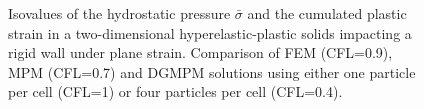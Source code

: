 \begin{figure}[h!]
  \centering
  \caption{Isovalues of the hydrostatic pressure $\bar{\sigma}$ and the cumulated plastic strain in a two-dimensional hyperelastic-plastic solids impacting a rigid wall under plane strain. Comparison of FEM (CFL=0.9), MPM (CFL=0.7) and DGMPM solutions using either one particle per cell (CFL=1) or four particles per cell (CFL=0.4).}
  \label{fig:PS_taylor_NL}
\end{figure}


%   

%   

